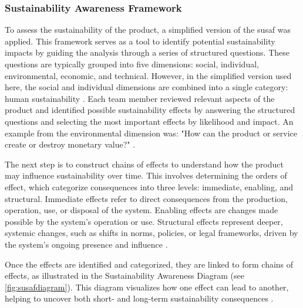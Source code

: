 \subsubsection{Sustainability Awareness Framework}\label{subsubsec:discussion:product:sustainability:susaf}

To assess the sustainability of the product, a simplified version of the \acrfull{susaf} was applied. This framework serves as a tool to identify potential sustainability impacts by guiding the analysis through a series of structured questions. These questions are typically grouped into five dimensions: social, individual, environmental, economic, and technical. However, in the simplified version used here, the social and individual dimensions are combined into a single category: human sustainability \cite{ntnususaf}. Each team member reviewed relevant aspects of the product and identified possible sustainability effects by answering the structured questions and selecting the most important effects by likelihood and impact. An example from the environmental dimension was: "How can the product or service create or destroy monetary value?" \cite{susosusaf}.

The next step is to construct chains of effects to understand how the product may influence sustainability over time. This involves determining the orders of effect, which categorize consequences into three levels: immediate, enabling, and structural. Immediate effects refer to direct consequences from the production, operation, use, or disposal of the system. Enabling effects are changes made possible by the system's operation or use. Structural effects represent deeper, systemic changes, such as shifts in norms, policies, or legal frameworks, driven by the system's ongoing presence and influence \cite{susosusaf}.

Once the effects are identified and categorized, they are linked to form chains of effects, as illustrated in the Sustainability Awareness Diagram (see \autoref{fig:susafdiagram}). This diagram visualizes how one effect can lead to another, helping to uncover both short- and long-term sustainability consequences \cite{susosusaf}.

